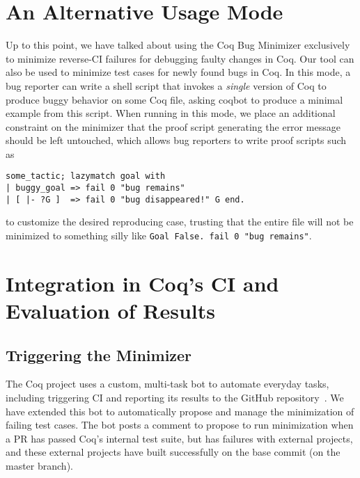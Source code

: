 \documentclass[a4paper,USenglish,cleveref,autoref,thm-restate]{lipics-v2021}
\makeatletter
\newcommand{\todo}[1]{%
\@latex@warning{TODO: \detokenize{#1} on page \thepage}%
\textcolor{red}{[\textbf{TODO:} #1]}}%
\makeatother
\begin{document}



\section{An Alternative Usage Mode}

Up to this point, we have talked about using the Coq Bug Minimizer exclusively to minimize reverse-CI failures for debugging faulty changes in Coq.
Our tool can also be used to minimize test cases for newly found bugs in Coq.
In this mode, a bug reporter can write a shell script that invokes a \emph{single} version of Coq to produce buggy behavior on some Coq file, asking coqbot to produce a minimal example from this script.
When running in this mode, we place an additional constraint on the minimizer that the proof script generating the error message should be left untouched,
which allows bug reporters to write proof scripts such as
\begin{verbatim}
some_tactic; lazymatch goal with
| buggy_goal => fail 0 "bug remains"
| [ |- ?G ]  => fail 0 "bug disappeared!" G end.
\end{verbatim}
to customize the desired reproducing case, trusting that the entire file will not be minimized to something silly like \verb|Goal False. fail 0 "bug remains"|.





\section{Integration in Coq's CI and Evaluation of Results}\label{sec:evaluation}

\subsection{Triggering the Minimizer}

The Coq project uses a custom, multi-task bot to automate everyday tasks, including triggering CI and reporting its results to the GitHub repository~\cite{zimmermann:hal-03479327}. We have extended this bot to automatically propose and manage the minimization of failing test cases. The bot posts a comment to propose to run minimization when a PR has passed Coq's internal test suite, but has failures with external projects, and these external projects have built successfully on the base commit (on the master branch).
\end{document}
